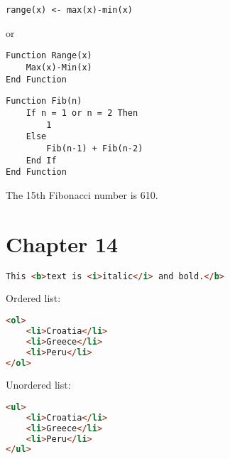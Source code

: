\documentclass[]{memoir}
\begin{document}
\lstinline!range(x) <- max(x)-min(x)!

or

\begin{lstlisting}
Function Range(x)
    Max(x)-Min(x)
End Function
\end{lstlisting}


\begin{lstlisting}
Function Fib(n)
    If n = 1 or n = 2 Then
        1
    Else
        Fib(n-1) + Fib(n-2)
    End If
End Function
\end{lstlisting}

The 15th Fibonacci number is 610.

\section{Chapter 14}


\begin{lstlisting}[language=HTML]
This <b>text is <i>italic</i> and bold.</b>
\end{lstlisting}


Ordered list:

\begin{lstlisting}[language=HTML]
<ol>
    <li>Croatia</li>
    <li>Greece</li>
    <li>Peru</li>
</ol>
\end{lstlisting}

Unordered list:

\begin{lstlisting}[language=HTML]
<ul>
    <li>Croatia</li>
    <li>Greece</li>
    <li>Peru</li>
</ul>
\end{lstlisting}

\end{document}
